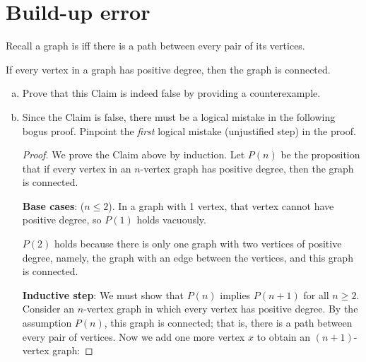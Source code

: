 \documentclass[12pt]{article}
\begin{document}
\section{Build-up error}
Recall a graph is  iff there is a path between every pair of its vertices.

\begin{falseclm*}
If every vertex in a graph has positive degree, then the graph is
connected.
\end{falseclm*}

\begin{enumerate}[(a)]

\item Prove that this Claim is indeed false by providing a
counterexample.


\item Since the Claim is false, there must be a logical mistake in the
following bogus proof.  Pinpoint the \emph{first} logical mistake
(unjustified step) in the proof.

\begin{proof}
  We prove the Claim above by induction.  Let $P(n)$ be the proposition
  that if every vertex in an $n$-vertex graph has positive degree, then
  the graph is connected.

\textbf{Base cases}: ($n \leq 2$).  In a graph with 1 vertex, that vertex
cannot have positive degree, so $P(1)$ holds vacuously.

$P(2)$ holds because there is only one graph with two vertices of positive
degree, namely, the graph with an edge between the vertices, and this
graph is connected.

\textbf{Inductive step}: We must show that $P(n)$ implies
$P(n+1)$ for all $n \geq 2$.  Consider an $n$-vertex graph in which every
vertex has positive degree.  By the assumption $P(n)$, this graph is
connected; that is, there is a path between every pair of vertices.  Now
we add one more vertex $x$ to obtain an $(n+1)$-vertex graph:


\end{proof}
\end{enumerate}
\end{document}
